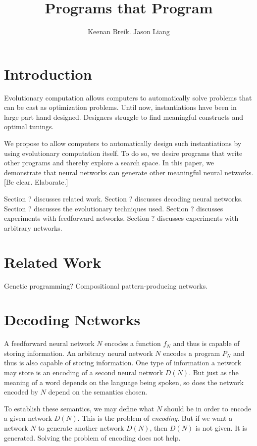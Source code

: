\documentclass[12pt]{article}
\newcommand{\term}[1]{\emph{#1}}
\begin{document}
\title{Programs that Program}
\author{Keenan Breik. Jason Liang}
\date{}
\maketitle

\section*{Introduction}

Evolutionary computation allows computers
to automatically solve problems
that can be cast as optimization problems.
Until now, instantiations have been
in large part hand designed.
Designers struggle to find meaningful constructs
and optimal tunings.

We propose to allow computers
to automatically design such instantiations
by using evolutionary computation itself.
To do so, we desire programs
that write other programs
and thereby explore a search space.
In this paper,
we demonstrate that neural networks
can generate other meaningful neural networks.
[Be clear. Elaborate.]

Section ? discusses related work.
Section ? discusses decoding neural networks.
Section ? discusses the evolutionary techniques used.
Section ? discusses experiments with feedforward networks.
Section ? discusses experiments with arbitrary networks.

\section*{Related Work}

Genetic programming?
Compositional pattern-producing networks.

\section*{Decoding Networks}

A feedforward neural network $N$ encodes a function $f_N$
and thus is capable of storing information.
An arbitrary neural network $N$ encodes a program $P_N$
and thus is also capable of storing information.
One type of information a network may store
is an encoding of a second neural network $D(N)$.
But just as the meaning of a word
depends on the language being spoken,
so does the network encoded by $N$
depend on the semantics chosen.

To establish these semantics,
we may define what $N$ should be
in order to encode a given network $D(N)$.
This is the problem of \term{encoding}.
But if we want a network $N$
to generate another network $D(N)$,
then $D(N)$ is not given.
It is generated.
Solving the problem of encoding does not help.
\end{document}
